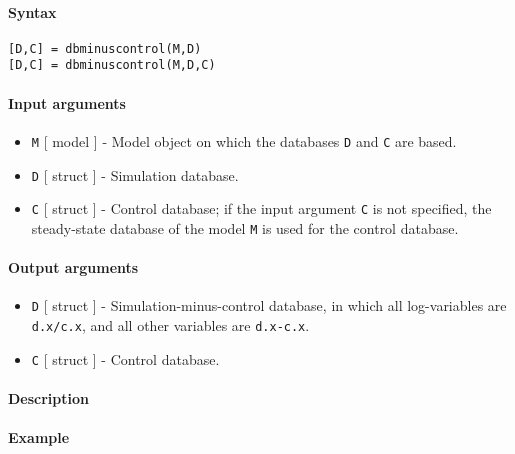 


	\paragraph{Syntax}\label{syntax}

\begin{verbatim}
[D,C] = dbminuscontrol(M,D)
[D,C] = dbminuscontrol(M,D,C)
\end{verbatim}

\paragraph{Input arguments}\label{input-arguments}

\begin{itemize}
\item
  \texttt{M} {[} model {]} - Model object on which the databases
  \texttt{D} and \texttt{C} are based.
\item
  \texttt{D} {[} struct {]} - Simulation database.
\item
  \texttt{C} {[} struct {]} - Control database; if the input argument
  \texttt{C} is not specified, the steady-state database of the model
  \texttt{M} is used for the control database.
\end{itemize}

\paragraph{Output arguments}\label{output-arguments}

\begin{itemize}
\item
  \texttt{D} {[} struct {]} - Simulation-minus-control database, in
  which all log-variables are \texttt{d.x/c.x}, and all other variables
  are \texttt{d.x-c.x}.
\item
  \texttt{C} {[} struct {]} - Control database.
\end{itemize}

\paragraph{Description}\label{description}

\paragraph{Example}\label{example}


